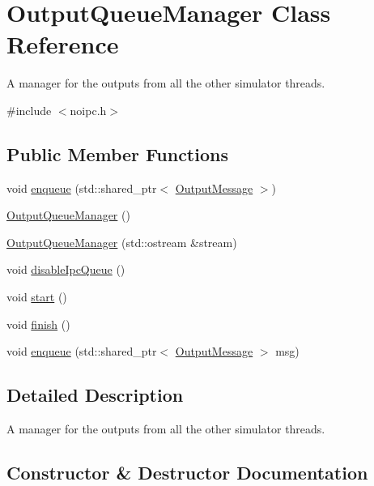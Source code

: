 \hypertarget{class_output_queue_manager}{}\section{Output\+Queue\+Manager Class Reference}
\label{class_output_queue_manager}


A manager for the outputs from all the other simulator threads.  




{\ttfamily \#include $<$noipc.\+h$>$}

\subsection*{Public Member Functions}
\begin{DoxyCompactItemize}
\item 
void \mbox{\hyperlink{class_output_queue_manager_a56584d3f134b6b82d89966ff279b5ad3}{enqueue}} (std\+::shared\+\_\+ptr$<$ \mbox{\hyperlink{class_output_message}{Output\+Message}} $>$)
\item 
\mbox{\hyperlink{class_output_queue_manager_ac43a9d5c192f146af0e616b5dfddda0f}{Output\+Queue\+Manager}} ()
\item 
\mbox{\hyperlink{class_output_queue_manager_a2a4013a7feaab6dae760946b383ff3da}{Output\+Queue\+Manager}} (std\+::ostream \&stream)
\item 
void \mbox{\hyperlink{class_output_queue_manager_a245cad36d3ca48fa0eb94bed6825e1ed}{disable\+Ipc\+Queue}} ()
\item 
void \mbox{\hyperlink{class_output_queue_manager_a750683e13f885589c99763eb93a8488f}{start}} ()
\item 
void \mbox{\hyperlink{class_output_queue_manager_abc1a72e97cdcd113097e3498ce4dfef1}{finish}} ()
\item 
void \mbox{\hyperlink{class_output_queue_manager_abcd58c0a7cfa9f8b5e74f3dd0ab65c2f}{enqueue}} (std\+::shared\+\_\+ptr$<$ \mbox{\hyperlink{class_output_message}{Output\+Message}} $>$ msg)
\end{DoxyCompactItemize}


\subsection{Detailed Description}
A manager for the outputs from all the other simulator threads. 

\subsection{Constructor \& Destructor Documentation}
\mbox{\label{class_output_queue_manager_ac43a9d5c192f146af0e616b5dfddda0f}} 
